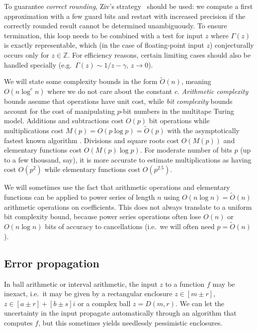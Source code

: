 \documentclass[reqno]{amsart}
\newcommand{\ZZ}{\mathbb{Z}}
\newcommand{\bigOtilde}{\widetilde O}
\theoremstyle{definition}
\begin{document}
To guarantee \emph{correct rounding},
Ziv's strategy~\cite{Ziv1991,MullerEtAl2018} should be used: we compute a first approximation
with a few guard bits and restart with increased precision if the
correctly rounded result cannot be determined unambiguously.
To ensure termination,
this loop needs to be combined with a test for input $z$ where $\Gamma(z)$
is exactly representable, which (in the case of floating-point input $z$) conjecturally occurs
only for $z \in \ZZ$.
For efficiency reasons, certain limiting cases should also
be handled specially (e.g.\ $\Gamma(z) \sim 1/z - \gamma$, $z \to 0$).

We will state some complexity bounds in the form $\bigOtilde(n)$,
meaning $O(n \log^c n)$ where we do not care about the constant $c$.
\emph{Arithmetic complexity} bounds assume that operations
have unit cost, while \emph{bit complexity} bounds account for the
cost of manipulating $p$-bit numbers in the multitape Turing model.
Additions and subtractions cost $O(p)$ bit operations
while multiplications cost $M(p) = O(p \log p) = \bigOtilde(p)$
with the asymptotically fastest known algorithm \cite{Harvey2021}.
Divisions and square roots cost $O(M(p))$
and elementary functions cost $O(M(p) \log p)$.
For moderate number of bits $p$ (up to a few thousand, say),
it is more accurate to estimate multiplications as having
cost $O(p^2)$ while elementary functions cost $O(p^{2.5})$.

We will sometimes use the fact that arithmetic operations and elementary
functions can be applied to power series of length $n$
using $O(n \log n) = \bigOtilde(n)$ arithmetic operations on coefficients.
This does not always translate to a uniform bit complexity bound,
because power series operations often lose $O(n)$ or $O(n \log n)$
bits of accuracy to cancellations (i.e.\ we will often need $p = \bigOtilde(n)$).

\subsection{Error propagation}

In ball arithmetic or interval arithmetic, the input $z$ to a function $f$ may be
inexact, i.e.\ it may be given by a rectangular enclosure
$z \in [m \pm r]$, $z \in [a \pm r] + [b \pm s] i$ or a complex ball $z = D(m, r)$.
We can let the uncertainty in the input propagate
automatically through an algorithm that computes $f$, but this sometimes yields
needlessly pessimistic enclosures.
\end{document}

